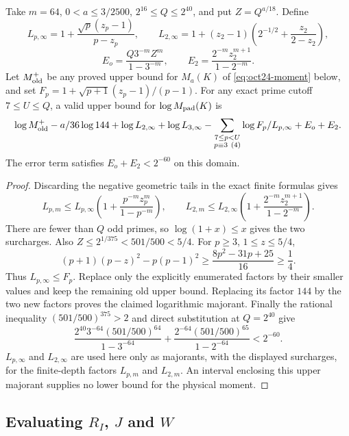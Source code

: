 \begin{corollary}
\label{cor:imp:padic-majorant}
Take $m=64$, $0<a\le3/2500$, $2^{16}\le Q\le2^{40}$, and
put $Z=Q^{a/18}$.  Define
\[
 L_{p,\infty}=1+\frac{\sqrt p(z_p-1)}{p-z_p},\qquad
 L_{2,\infty}=1+(z_2-1)\left(2^{-1/2}+\frac{z_2}{2-z_2}\right),
\]
\[
 E_o=\frac{Q3^{-m}Z^m}{1-3^{-m}},\qquad
 E_2=\frac{2^{-m}z_2^{m+1}}{1-2^{-m}}.
\]
Let $M_{\rm old}^{+}$ be any proved upper bound for $M_a(K)$ of \eqref{eq:oct24-moment} below, and set
$F_p=1+\sqrt{p+1}(z_p-1)/(p-1)$.  For any exact prime cutoff
$7\le U\le Q$, a valid upper bound for $\log M_{\rm pad}(K)$ is
\begin{align*}
 \log M_{\rm old}^{+}-\frac a{36}\log144
  +\log L_{2,\infty}+\log L_{3,\infty}
  -\sum_{\substack{7\le p<U\\p\equiv3\ (4)}}
       \log\frac{F_p}{L_{p,\infty}}+E_o+E_2.
\end{align*}
The error term satisfies $E_o+E_2<2^{-60}$ on this domain.
\end{corollary}
\begin{proof}
Discarding the negative geometric tails in the exact finite
formulas gives
\[
 L_{p,m}\le L_{p,\infty}
       \left(1+\frac{p^{-m}z_p^m}{1-p^{-m}}\right),\qquad
 L_{2,m}\le L_{2,\infty}
       \left(1+\frac{2^{-m}z_2^{m+1}}{1-2^{-m}}\right).
\]
There are fewer than $Q$ odd primes, so $\log(1+x)\le x$
gives the two surcharges.  Also
$Z\le2^{1/375}<501/500<5/4$.  For $p\ge3$, $1\le z\le5/4$,
\[
 (p+1)(p-z)^2-p(p-1)^2
 \ge\frac{8p^2-31p+25}{16}\ge\frac14.
\]
Thus $L_{p,\infty}\le F_p$.  Replace only the explicitly
enumerated factors by their smaller values and keep the remaining
old upper bound.  Replacing its factor $144$ by the two new factors
proves the claimed logarithmic majorant.  Finally the rational
inequality $(501/500)^{375}>2$ and direct substitution at
$Q=2^{40}$ give
\[
 \frac{2^{40}3^{-64}(501/500)^{64}}{1-3^{-64}}
 +\frac{2^{-64}(501/500)^{65}}{1-2^{-64}}<2^{-60}.
\]
$L_{p,\infty}$ and $L_{2,\infty}$ are used here only as majorants, with the displayed surcharges, for the finite-depth factors $L_{p,m}$ and $L_{2,m}$.  An interval
enclosing this upper majorant supplies no lower bound for the
physical moment.
\end{proof}


\subsection{Evaluating \texorpdfstring{$R_I$}{R\_I}, \texorpdfstring{$J$}{J} and \texorpdfstring{$W$}{W}}

